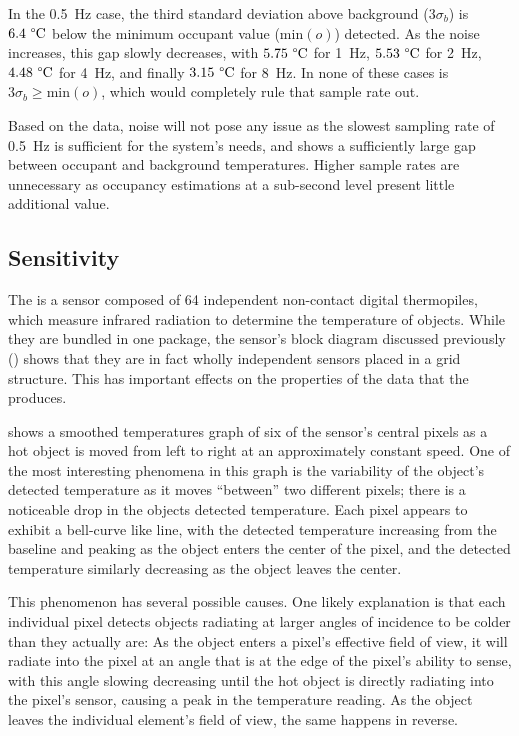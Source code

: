 \documentclass[../thesis/thesis.tex]{subfiles}
\begin{document}
In the 0.5~Hz case, the third standard deviation above background ($3\sigma_b$) is $6.4~\degree\textrm{C}$ below the minimum occupant value ($\mathrm{min}(o)$) detected. As the noise increases, this gap slowly decreases, with $5.75~\degree\textrm{C}$ for 1~Hz, $5.53~\degree\textrm{C}$ for 2~Hz, $4.48~\degree\textrm{C}$ for 4~Hz, and finally $3.15~\degree\textrm{C}$ for 8~Hz. In none of these cases is $3\sigma_b \ge \mathrm{min}(o)$, which would completely rule that sample rate out.

Based on the data, noise will not pose any issue as the slowest sampling rate of 0.5~Hz is sufficient for the system's needs, and shows a sufficiently large gap between occupant and background temperatures. Higher sample rates are unnecessary as occupancy estimations at a sub-second level present little additional value.


\subsection{Sensitivity}
\label{subsec:sensitivity}

The \mlx is a sensor composed of 64 independent non-contact digital thermopiles, which measure infrared radiation to determine the temperature of objects. While they are bundled in one package, the sensor's block diagram discussed previously () shows that they are in fact wholly independent sensors placed in a grid structure. This has important effects on the properties of the data that the \mlx produces. 

 shows a smoothed temperatures graph of six of the sensor's central pixels as a hot object is moved from left to right at an approximately constant speed. One of the most interesting phenomena in this graph is the variability of the object's detected temperature as it moves ``between'' two different pixels; there is a noticeable drop in the objects detected temperature. Each pixel appears to exhibit a bell-curve like line, with the detected temperature increasing from the baseline and peaking as the object enters the center of the pixel, and the detected temperature similarly decreasing as the object leaves the center. 

This phenomenon has several possible causes. One likely explanation is that each individual pixel detects objects radiating at larger angles of incidence to be colder than they actually are: As the object enters a pixel's effective field of view, it will radiate into the pixel at an angle that is at the edge of the pixel's ability to sense, with this angle slowing decreasing until the hot object is directly radiating into the pixel's sensor, causing a peak in the temperature reading. As the object leaves the individual element's field of view, the same happens in reverse.
\end{document}
